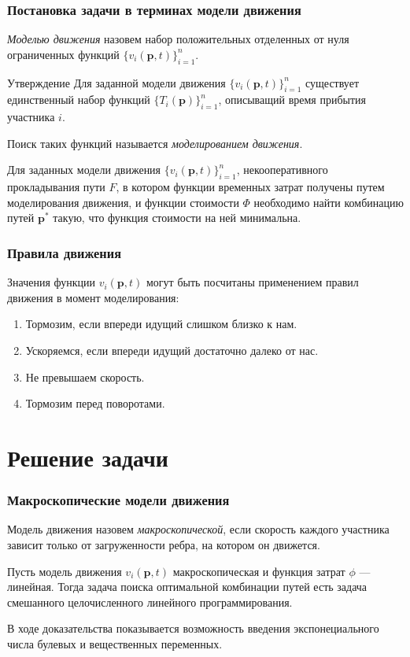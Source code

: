 \documentclass{beamer}
\begin{document}
\begin{frame}\frametitle{Постановка задачи в терминах модели движения}
\textit{Моделью движения} назовем набор положительных отделенных от нуля ограниченных функций $\{v_i(\textbf{p}, t)\}_{i = 1}^n$.

\begin{block}{Утверждение}
	Для заданной модели движения $\{v_i(\textbf{p}, t)\}_{i = 1}^n$ существует единственный набор функций $\{T_i(\textbf{p})\}_{i = 1}^n$, описыващий время прибытия участника $i$.
\end{block}

Поиск таких функций называется \textit{моделированием движения}.

\bigskip

Для заданных модели движения $\{v_i(\textbf{p}, t)\}_{i = 1}^n$, некооперативного прокладывания пути $F$, в котором функции временных затрат получены путем моделирования движения, и функции стоимости $\Phi$ необходимо найти комбинацию путей $\textbf{p}^*$ такую, что функция стоимости на ней минимальна.

\end{frame}

\begin{frame}\frametitle{Правила движения}
	Значения функции $v_i(\textbf{p}, t)$ могут быть посчитаны применением правил движения в момент моделирования:
	\begin{enumerate}
		\item Тормозим, если впереди идущий слишком близко к нам.
		\item Ускоряемся, если впереди идущий достаточно далеко от нас.
		\item Не превышаем скорость.
		\item Тормозим перед поворотами.
	\end{enumerate}
\end{frame}

\section{Решение задачи}

\begin{frame}\frametitle{Макроскопические модели движения}
	Модель движения назовем \textit{макроскопической}, если скорость каждого участника зависит только от загруженности ребра, на котором он движется.

	\begin{theorem}
	Пусть модель движения $ v_i(\textbf{p}, t)$ макроскопическая и функция затрат $\phi$ --- линейная. Тогда задача поиска оптимальной комбинации путей есть задача смешанного целочисленного линейного программирования. 
	\end{theorem}

	В ходе доказательства показывается возможность введения экспонециального числа булевых и вещественных переменных.
	
\end{frame}
\end{document}

